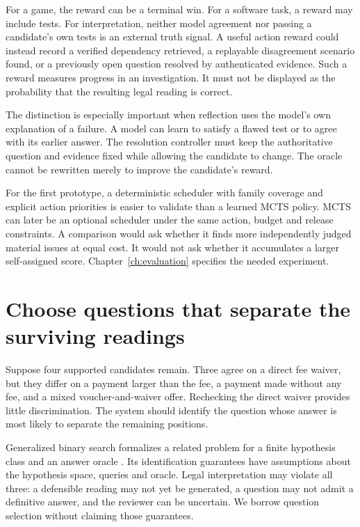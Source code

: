 \documentclass[12pt,a4paper,oneside,openany]{book}
\begin{document}
For a game, the reward can be a terminal win. For a software task, a reward may
include tests. For interpretation, neither model agreement nor passing a
candidate's own tests is an external truth signal. A useful action reward could
instead record a verified dependency retrieved, a replayable disagreement
scenario found, or a previously open question resolved by authenticated evidence.
Such a reward measures progress in an investigation. It must not be displayed as
the probability that the resulting legal reading is correct.

The distinction is especially important when reflection uses the model's own
explanation of a failure. A model can learn to satisfy a flawed test or to agree
with its earlier answer. The resolution controller must keep the authoritative
question and evidence fixed while allowing the candidate to change. The oracle
cannot be rewritten merely to improve the candidate's reward.

For the first prototype, a deterministic scheduler with family coverage and
explicit action priorities is easier to validate than a learned MCTS policy.
MCTS can later be an optional scheduler under the same action, budget and release
constraints. A comparison would ask whether it finds more independently judged
material issues at equal cost. It would not ask whether it accumulates a larger
self-assigned score. Chapter~\ref{ch:evaluation} specifies the needed experiment.

\section{Choose questions that separate the surviving readings}

Suppose four supported candidates remain. Three agree on a direct fee waiver,
but they differ on a payment larger than the fee, a payment made without any fee,
and a mixed voucher-and-waiver offer. Rechecking the direct waiver provides
little discrimination. The system should identify the question whose answer is
most likely to separate the remaining positions.

Generalized binary search formalizes a related problem for a finite hypothesis
class and an answer oracle \citep[Figure 1 and sections I--II]{gbs2011}. Its
identification guarantees have assumptions about the hypothesis space, queries
and oracle. Legal interpretation may violate all three: a defensible reading may
not yet be generated, a question may not admit a definitive answer, and the
reviewer can be uncertain. We borrow question selection without claiming those
guarantees.
\end{document}
